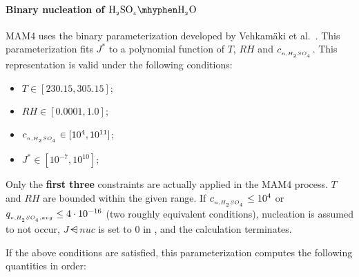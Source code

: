 \paragraph{Binary nucleation of $\rsag \mhyphen \rwater$}

MAM4 uses the binary parameterization developed by
Vehkam\"aki et al.~\citep{vehkamaki-2002-jgr}. This parameterization fits $J^*$
to a polynomial function of $T$, $RH$ and $c_{_{n,H_{_2}SO_{_4}}}$. This representation
is valid under the following conditions:

\begin{itemize}
  \item $T \in [230.15, 305.15]$;
  \item $RH \in [0.0001, 1.0]$;
  \item $c_{_{n,H_{_2}SO_{_4}}} \in [10^4, 10^{11}]$;
  \item $J^* \in [10^{-7}, 10^{10}]$;
\end{itemize}

Only the \textbf{first three} constraints are actually applied in the MAM4
process. $T$ and $RH$ are bounded within the given range. If
$c_{_{n,H_{_2}SO_{_4}}} \le 10^4$ or $q_{_{v,H_{_2}SO_{_4},avg}} \le 4 \cdot 10^{-16}$
(two roughly equivalent conditions), nucleation is assumed to not occur,
$J\dsub{nuc}$ is set to $0$ in , and the calculation
terminates.

If the above conditions are satisfied, this parameterization computes the
following quantities in order:

